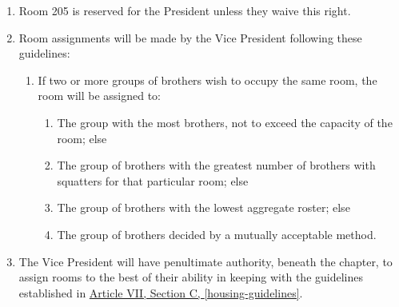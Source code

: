 \begin{enumerate}
		\item Room 205 is reserved for the President unless they waive this right.

		\item Room assignments will be made by the Vice President following these guidelines: \label{housing-guidelines}
			\begin{enumerate}
				\item If two or more groups of brothers wish to occupy the same room, the room will be assigned to:

					\begin{enumerate}
						\item The group with the most brothers, not to exceed the capacity of the room; else
						\item The group of brothers with the greatest number of brothers with \gls{squatters} for that particular room; else
						\item The group of brothers with the lowest aggregate \gls{roster}; else
						\item The group of brothers decided by a mutually acceptable method.
					\end{enumerate}
			\end{enumerate}

		\item The Vice President will have penultimate authority, beneath the chapter, to assign rooms to the best of their ability in keeping with the guidelines established in \hyperref[housing-guidelines]{Article VII, Section C, \autoref*{housing-guidelines}}.

	\end{enumerate}
